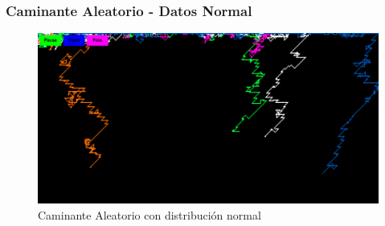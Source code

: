 \begin{frame}
	\frametitle{Caminante Aleatorio - Datos Normal}
	\begin{figure}
		\centering
		\includegraphics[width=\textwidth]{walkerNormal} %
		\caption{Caminante Aleatorio con distribución normal}
	\end{figure}
\end{frame}

